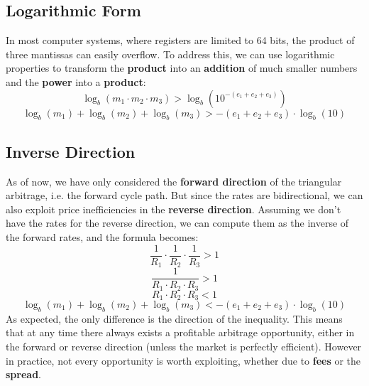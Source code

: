 \documentclass[11pt]{article}
\begin{document}
\subsection{Logarithmic Form}
In most computer systems, where registers are limited to 64 bits, the product of three mantissas can easily overflow. To address this, we can use logarithmic properties to transform the \textbf{product} into an \textbf{addition} of much smaller numbers and the \textbf{power} into a \textbf{product}:
\begin{equation}
    \log_b(m_1 \cdot m_2 \cdot m_3) > \log_b(10^{-(e_1 + e_2 + e_3)})
\end{equation}
\begin{equation}
    \log_b(m_1) + \log_b(m_2) + \log_b(m_3) > -(e_1 + e_2 + e_3) \cdot \log_b(10)
\end{equation}

\subsection{Inverse Direction}
As of now, we have only considered the \textbf{forward direction} of the triangular arbitrage, i.e. the forward cycle path. But since the rates are bidirectional, we can also exploit price inefficiencies in the \textbf{reverse direction}. Assuming we don't have the rates for the reverse direction, we can compute them as the inverse of the forward rates, and the formula becomes:
\setcounter{equation}{0}
\begin{equation}
    \frac{1}{R_{1}} \cdot \frac{1}{R_{2}} \cdot \frac{1}{R_{3}} > 1
\end{equation}
\begin{equation}
    \frac{1}{R_{1} \cdot R_{2} \cdot R_{3}} > 1
\end{equation}
\begin{equation}
    R_{1} \cdot R_{2} \cdot R_{3} < 1
\end{equation}
\begin{equation}
    \log_b(m_1) + \log_b(m_2) + \log_b(m_3) < -(e_1 + e_2 + e_3) \cdot \log_b(10)
\end{equation}
As expected, the only difference is the direction of the inequality. This means that at any time there always exists a profitable arbitrage opportunity, either in the forward or reverse direction (unless the market is perfectly efficient). However in practice, not every opportunity is worth exploiting, whether due to \textbf{fees} or the \textbf{spread}\textsuperscript{\cite{spread}}.
\end{document}
